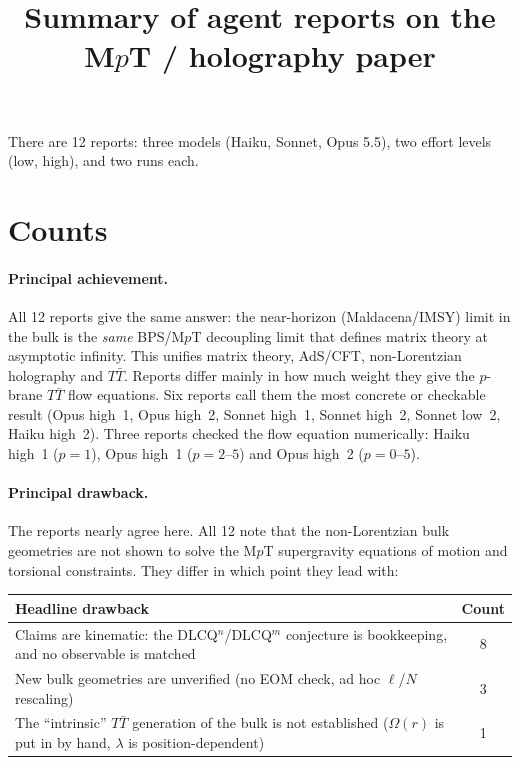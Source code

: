 \documentclass[11pt]{article}
\title{Summary of agent reports on the M$p$T / holography paper}
\date{}
\begin{document}
\maketitle
\vspace{-3em}

\noindent There are 12 reports: three models (Haiku, Sonnet, Opus 5.5), two effort levels (low, high), and two runs each.

\section*{Counts}

\paragraph{Principal achievement.} All 12 reports give the same answer: the near-horizon (Maldacena/IMSY) limit in the bulk is the \emph{same} BPS/M$p$T decoupling limit that defines matrix theory at asymptotic infinity. This unifies matrix theory, AdS/CFT, non-Lorentzian holography and $T\bar T$. Reports differ mainly in how much weight they give the $p$-brane $T\bar T$ flow equations. Six reports call them the most concrete or checkable result (Opus high~1, Opus high~2, Sonnet high~1, Sonnet high~2, Sonnet low~2, Haiku high~2). Three reports checked the flow equation numerically: Haiku high~1 ($p=1$), Opus high~1 ($p=2$--$5$) and Opus high~2 ($p=0$--$5$).

\paragraph{Principal drawback.} The reports nearly agree here. All 12 note that the non-Lorentzian bulk geometries are not shown to solve the M$p$T supergravity equations of motion and torsional constraints. They differ in which point they lead with:
\begin{center}
\begin{tabular}{p{}c}
\toprule
Headline drawback & Count\\
\midrule
Claims are kinematic: the DLCQ$^n$/DLCQ$^m$ conjecture is bookkeeping, and no observable is matched & 8\\
New bulk geometries are unverified (no EOM check, ad hoc $\ell$/$N$ rescaling) & 3\\
The ``intrinsic'' $T\bar T$ generation of the bulk is not established ($\Omega(r)$ is put in by hand, $\lambda$ is position-dependent) & 1\\
\bottomrule
\end{tabular}
\end{center}
\end{document}
